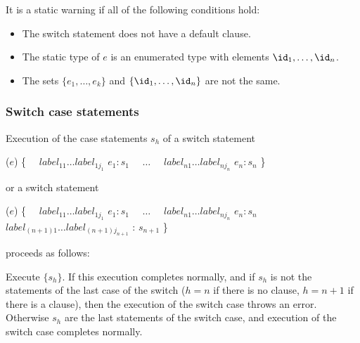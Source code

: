 \documentclass[makeidx]{article}
\begin{document}
{

\LMHash{}%
It is a static warning if all of the following conditions hold:
\begin{itemize}
\item The switch statement does not have a default clause.
\item The static type of $e$ is an enumerated
  type with elements $\id_1, \ldots, \id_n$.
\item The sets $\{e_1, \ldots, e_k\} $ and $\{\id_1, \ldots, \id_n\}$
  are not the same.
\end{itemize}



\subsubsection{Switch case statements}

\LMHash{}%
Execution of the case statements $s_h$ of a switch statement

\begin{normativeDartCode}
\SWITCH{} ($e$) \{
\ \ $label_{11} \ldots label_{1j_1}$ \CASE{} $e_1: s_1$
\ \ $\ldots$
\ \ $label_{n1} \ldots label_{nj_n}$ \CASE{} $e_n: s_n$
\}
\end{normativeDartCode}

or a switch statement

\begin{normativeDartCode}
\SWITCH{} ($e$) \{
\ \ $label_{11} \ldots label_{1j_1}$ \CASE{} $e_1: s_1$
\ \ $\ldots$
\ \ $label_{n1} \ldots label_{nj_n}$ \CASE{} $e_n: s_n$
\ \ $label_{(n+1)1} \ldots label_{(n+1)j_{n+1}}$ \DEFAULT{}: $s_{n+1}$
\}
\end{normativeDartCode}

proceeds as follows:

\LMHash{}%
Execute $\{s_h\}$.
If this execution completes normally,
and if $s_h$ is not the statements of the last case of the switch
($h = n$ if there is no \DEFAULT{} clause,
$h = n+1$ if there is a \DEFAULT{} clause),
then the execution of the switch case throws an error.
Otherwise $s_h$ are the last statements of the switch case,
and execution of the switch case completes normally.


}
\end{document}
